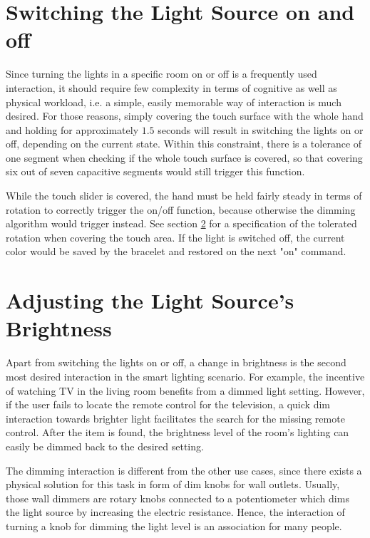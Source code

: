 \section{Switching the Light Source on and off}
\label{sec:onoff}
Since turning the lights in a specific room on or off is a frequently used interaction, it should require few complexity in terms of cognitive as well as physical workload, i.e. a simple, easily memorable way of interaction is much desired. For those reasons, simply covering the touch surface with the whole hand and holding for approximately $1.5$ seconds will result in switching the lights on or off, depending on the current state. Within this constraint, there is a tolerance of one segment when checking if the whole touch surface is covered, so that covering six out of seven capacitive segments would still trigger this function.

While the touch slider is covered, the hand must be held fairly steady in terms of rotation to correctly trigger the on/off function, because otherwise the dimming algorithm would trigger instead. See section \ref{sec:dimming} for a specification of the tolerated rotation when covering the touch area. If the light is switched off, the current color would be saved by the bracelet and restored on the next "on" command.

\section{Adjusting the Light Source's Brightness}
\label{sec:dimming}
Apart from switching the lights on or off, a change in brightness is the second most desired interaction in the smart lighting scenario. For example, the incentive of watching TV in the living room benefits from a dimmed light setting. However, if the user fails to locate the remote control for the television, a quick dim interaction towards brighter light facilitates the search for the missing remote control. After the item is found, the brightness level of the room's lighting can easily be dimmed back to the desired setting.

The dimming interaction is different from the other use cases, since there exists a physical solution for this task in form of dim knobs for wall outlets. Usually, those wall dimmers are rotary knobs connected to a potentiometer which dims the light source by increasing the electric resistance. Hence, the interaction of turning a knob for dimming the light level is an association for many people.


